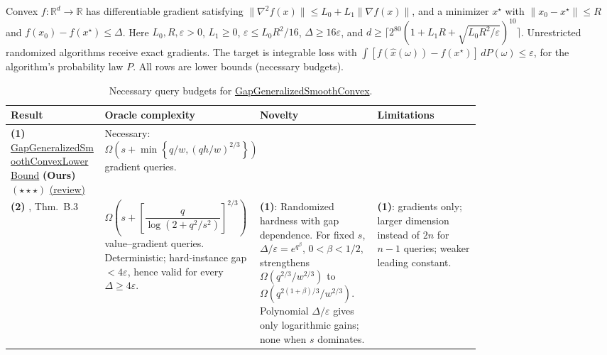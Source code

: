 \begin{table}[tp]
\centering
\caption{Necessary query budgets for \href{https://github.com/k3nfalt/longtails/blob/main/LongTails/Setups/GapGeneralizedSmoothConvex.lean}{GapGeneralizedSmoothConvex}.}\label{tab:GapGeneralizedSmoothConvex}
\parbox{\linewidth}{\footnotesize Convex $f:\mathbb{R}^d\to\mathbb{R}$ has differentiable gradient satisfying $\|\nabla^2f(x)\|\le L_0+L_1\|\nabla f(x)\|$, and a minimizer $x^\star$ with $\|x_0-x^\star\|\le R$ and $f(x_0)-f(x^\star)\le\Delta$. Here $L_0,R,\varepsilon>0$, $L_1\ge0$, $\varepsilon\le L_0R^2/16$, $\Delta\ge16\varepsilon$, and $d\ge\lceil2^{80}(1+L_1R+\sqrt{L_0R^2/\varepsilon})^{10}\rceil$. Unrestricted randomized algorithms receive exact gradients. The target is integrable loss with $\int[f(\hat x(\omega))-f(x^\star)]\,dP(\omega)\le\varepsilon$, for the algorithm's probability law $P$. All rows are lower bounds (necessary budgets).}\par\smallskip
\begin{threeparttable}
\footnotesize
\setlength{\tabcolsep}{4pt}\renewcommand{\arraystretch}{1.25}
\begin{tabularx}{\linewidth}{@{}>{\raggedright\arraybackslash}p{0.20\linewidth}>{\raggedright\arraybackslash}p{0.32\linewidth}>{\raggedright\arraybackslash}p{0.25\linewidth}>{\raggedright\arraybackslash}X@{}}
\toprule
\textbf{Result} & \textbf{Oracle complexity} & \textbf{Novelty} & \textbf{Limitations} \\
\midrule
\textbf{(1)} \href{https://github.com/k3nfalt/longtails/blob/main/LongTails/Theorems/GapGeneralizedSmoothConvexLowerBound.lean}{Gap\allowbreak Generalized\allowbreak Smooth\allowbreak Convex\allowbreak Lower\allowbreak Bound} \textbf{(Ours)} $(\star\star\star)$ \href{https://github.com/k3nfalt/longtails/blob/main/scripts/reviews/GapGeneralizedSmoothConvexLowerBound.md}{(review)} & Necessary: $\Omega\!\left(s+\min\left\{q/w,(qh/w)^{2/3}\right\}\right)$ gradient queries. &  &  \\
\midrule[1.2pt]
\textbf{(2)} \citep{gapEverestI2026v2Verified}, Thm.~B.3 & $\Omega\!\left(s+\left[\dfrac q{\log(2+q^2/s^2)}\right]^{2/3}\right)$ value--gradient queries. Deterministic; hard-instance gap $<4\varepsilon$, hence valid for every $\Delta\ge4\varepsilon$. & \textbf{(1)}: Randomized hardness with gap dependence. For fixed $s$, $\Delta/\varepsilon=e^{q^\beta}$, $0<\beta<1/2$, strengthens $\Omega(q^{2/3}/w^{2/3})$ to $\Omega(q^{2(1+\beta)/3}/w^{2/3})$. Polynomial $\Delta/\varepsilon$ gives only logarithmic gains; none when $s$ dominates. & \textbf{(1)}: gradients only; larger dimension instead of $2n$ for $n-1$ queries; weaker leading constant. \\

\end{tabularx}
\end{threeparttable}
\end{table}
